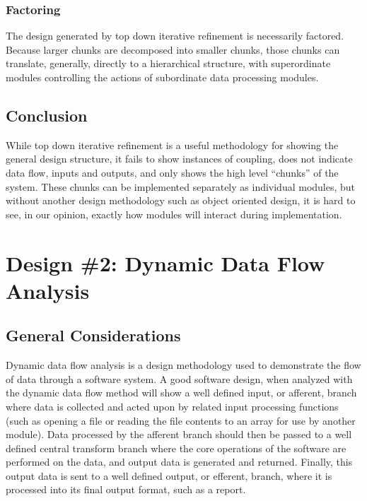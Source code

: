 \documentclass{article}
\begin{document}
		\subsubsection{Factoring}
			The design generated by top down iterative refinement is necessarily factored. Because larger chunks are decomposed into smaller chunks, those chunks can translate, generally, directly to a hierarchical structure, with superordinate modules controlling the actions of subordinate data processing modules. 
	\subsection{Conclusion}
		While top down iterative refinement is a useful methodology for showing the general design structure, it fails to show instances of coupling, does not indicate data flow, inputs and outputs, and only shows the high level ``chunks'' of the system. These chunks can be implemented separately as individual modules, but without another design methodology such as object oriented design, it is hard to see, in our opinion, exactly how modules will interact during implementation. 
%
%
\section{Design \#2: Dynamic Data Flow Analysis}
	\subsection{General Considerations}
		Dynamic data flow analysis is a design methodology used to demonstrate the flow of data through a software system. A good software design, when analyzed with the dynamic data flow method will show a well defined input, or afferent, branch where data is collected and acted upon by related input processing functions (such as opening a file or reading the file contents to an array for use by another module). Data processed by the afferent branch should then be passed to a well defined central transform branch where the core operations of the software are performed on the data, and output data is generated and returned. Finally, this output data is sent to a well defined output, or efferent, branch, where it is processed into its final output format, such as a report. 
	
\end{document}
